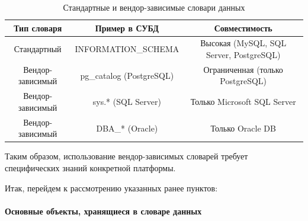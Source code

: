 \begin{table}[H]
    \centering
    \begin{tabular}{|c|c|c|}
        \hline
        \textbf{Тип словаря} & \textbf{Пример в СУБД} & \textbf{Совместимость} \\
        \hline
        Стандартный & INFORMATION\_SCHEMA & Высокая (MySQL, SQL Server, PostgreSQL) \\
        \hline
        Вендор-зависимый & pg\_catalog (PostgreSQL) & Ограниченная (только PostgreSQL) \\
        \hline
        Вендор-зависимый & sys.* (SQL Server) & Только Microsoft SQL Server \\
        \hline
        Вендор-зависимый & DBA\_* (Oracle) & Только Oracle DB \\
        \hline
    \end{tabular}
    \caption{Стандартные и вендор-зависимые словари данных}
    \label{tab:data_dictionary_comparison}
\end{table}

Таким образом, использование вендор-зависимых словарей требует специфических знаний конкретной платформы.

Итак, перейдем к рассмотрению указанных ранее пунктов:

\paragraph{Основные объекты, хранящиеся в словаре данных}

